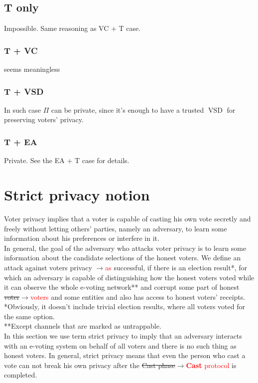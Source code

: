 \documentclass[12pt]{article}
\newcommand{\fix}[2]{\sout{#1}$\rightarrow$\textcolor{red}{#2}}
\DeclareMathOperator{\vsd}{VSD}
\begin{document}
\subsection{T only}
  Impossible. Same reasoning as VC + T case.
\subsubsection{T + VC}
   seems meaningless
\subsubsection{T + VSD}
    In such case $\Pi$ can be private, since it's enough to have a trusted $\vsd$ for preserving voters' privacy. 
\subsubsection{T + EA}
   Private. See the EA + T case for details. 
%
%
\section{Strict privacy notion}
Voter privacy implies that a voter is capable of casting his own vote secretly and freely without letting others' parties, namely an adversary, to learn some information about his preferences or interfere in it.\\

In general, the goal of the adversary who attacks voter privacy is to learn some information about the candidate selections of the honest voters. We define an attack against voters privacy \fix{}{as} successful, if there is an election result*, for which an adversary is capable of distinguishing how the honest voters voted while it can observe the whole e-voting network** and corrupt some part of honest \fix{voter}{voters} and some entities and also has access to honest voters' receipts. \\

*Obviously, it doesn't include trivial election results, where all voters voted for the same option. \\
**Except channels that are marked as untrappable. \\



In this section we use term strict privacy to imply that an adversary interacts with an e-voting system on behalf of all voters and there is no such thing as honest voters. In general, strict privacy means that even the person who cast a vote can not break his own privacy after the \fix{Cast phase}{\textbf{Cast} protocol} is completed. \\
\end{document}
